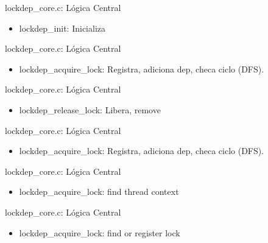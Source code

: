 \documentclass{beamer}
\newcommand{\cCore}{../../src/lockdep/lockdep_core.c}
\begin{document}
\begin{frame}{lockdep_core.c: Lógica Central}
  \begin{itemize}
    \item lockdep_init: Inicializa
  \end{itemize}
  
\end{frame}

\begin{frame}{lockdep_core.c: Lógica Central}
  \begin{itemize}
    \item lockdep_acquire_lock: Registra, adiciona dep, checa ciclo (DFS).
  \end{itemize}
  
\end{frame}

\begin{frame}{lockdep_core.c: Lógica Central}
  \begin{itemize}
    \item lockdep_release_lock: Libera, remove
  \end{itemize}
  
\end{frame}

\begin{frame}{lockdep_core.c: Lógica Central}
  \begin{itemize}
    \item lockdep_acquire_lock: Registra, adiciona dep, checa ciclo (DFS).
  \end{itemize}
  
\end{frame}

\begin{frame}{lockdep_core.c: Lógica Central}
  \begin{itemize}
    \item lockdep_acquire_lock: find thread context
  \end{itemize}
  
\end{frame}

\begin{frame}{lockdep_core.c: Lógica Central}
  \begin{itemize}
    \item lockdep_acquire_lock: find or register lock
  \end{itemize}
  
\end{frame}
\end{document}
